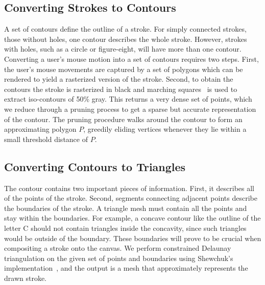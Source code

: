 \documentclass[review]{acmsiggraph}
\begin{document}
\subsection{Converting Strokes to Contours}
A set of contours define the outline of a stroke. For simply connected strokes, those without holes, 
one contour describes the whole stroke. However, strokes with holes, such as a circle or 
figure-eight, will have more than one contour.
Converting a user's mouse motion into a set of contours requires two steps.
First, the user's mouse movements are captured by a set of polygons which can be
rendered to yield a rasterized version of the stroke.
Second, to obtain the contours the stroke is rasterized in black and marching squares~\cite{lorensen1987}
is used to extract iso-contours of 50\% gray. This returns a very dense set of points,
which we reduce through a pruning process to
get a sparse but accurate representation of the contour.
The pruning procedure walks around the contour to form an approximating polygon $P$,
greedily eliding vertices whenever they lie within a small threshold distance of $P$.



\subsection{Converting Contours to Triangles}
The contour contains two important pieces of information. First, it describes all of the points of the stroke.
Second, segments connecting adjacent points describe the boundaries of the stroke. 
A triangle mesh must contain all the points and stay
within the boundaries. 
For example, a concave contour like the outline of the letter C should not contain 
triangles inside the concavity, since such triangles would be outside of the boundary.
These boundaries will prove to be crucial when compositing a stroke onto the canvas.
%
We perform constrained Delaunay triangulation on the given set of points and boundaries using
Shewchuk's implementation~, and the output is a mesh that
approximately represents the drawn stroke.
\end{document}
